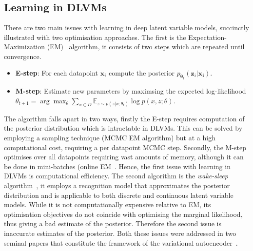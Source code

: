 \subsection{Learning in DLVMs}
There are two main issues with learning in deep latent variable models, succinctly illustrated with two optimisation approaches. The first is the Expectation-Maximization (EM)~\cite{dempster1977maximum} algorithm, it consists of two steps which are repeated until convergence.
\begin{itemize}
	\item \textbf{E-step}: For each datapoint $\mathbf{x}_i$ compute the posterior $p_{\boldsymbol{\theta}_t}(\mathbf{z}_i|\mathbf{x_i})$.
	\item \textbf{M-step}: Estimate new parameters by maximsing the expected log-likelihood $\theta_{t+1}=\arg \max _{\theta} \sum_{x \in D} \mathbb{E}_{z \sim p\left(z | x ; \theta_{t}\right)} \log p(x, z ; \theta)$.
\end{itemize}
The algorithm falls apart in two ways, firstly the E-step requires computation of the posterior distribution which is intractable in DLVMs. This can be solved by employing a sampling technique (MCMC EM algorithm) but at a high computational cost, requiring a per datapoint MCMC step. Secondly, the M-step optimises over all datapoints requiring vast amounts of memory, although it can be done in mini-batches (online EM~\cite{hoffman2010online}. Hence, the first issue with learning in DLVMs is computational efficiency. The second algorithm is the \emph{wake-sleep} algorithm~\cite{hinton1995wake}, it employs a recognition model that approximates the posterior distribution and is applicable to both discrete and continuous latent variable models. While it is not computationally expensive relative to EM, its optimisation objectives do not coincide with optimising the marginal likelihood, thus giving a bad estimate of the posterior. Therefore the second issue is inaccurate estimates of the posterior. Both these issues were addressed in two seminal papers that constitute the framework of the variational autoencoder~\cite{kingma2013auto, rezende2014stochastic}. 

